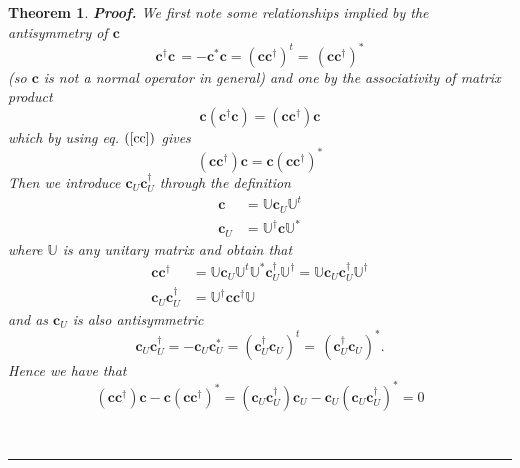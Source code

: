 \documentclass[aps,preprint]{revtex4}%
\newtheorem{theorem}{Theorem}
\newenvironment{proof}[1][Proof]{\noindent\textbf{#1.} }{\ \rule{0.5em}{0.5em}}
\begin{document}
\begin{theorem}
\begin{proof}
We first note some relationships implied by the antisymmetry of $\mathbf{c}$%
\begin{equation}
\mathbf{c}^{\dagger}\mathbf{c\,=-c}^{\ast}\mathbf{c}=\left(  \mathbf{cc}%
^{\dagger}\right)  ^{t}=\mathbf{\,}\left(  \mathbf{cc}^{\dagger}\right)
^{\ast} \label{cc}%
\end{equation}
(so $\mathbf{c}$ is not a normal operator in general) and one by the
associativity of matrix product
\begin{equation}
\mathbf{c}\left(  \mathbf{c}^{\dagger}\mathbf{c}\right)  =\left(
\mathbf{cc}^{\dagger}\right)  \mathbf{c}%
\end{equation}
which by using eq. $\left(  \ref{cc}\right)  $ gives
\begin{equation}
\left(  \mathbf{cc}^{\dagger}\right)  \mathbf{c=c}\left(  \mathbf{cc}%
^{\dagger}\right)  ^{\ast} \label{cr}%
\end{equation}
Then we introduce $\mathbf{c}_{U}\mathbf{c}_{U}^{\dagger}$ through the
definition
\begin{align}
\mathbf{c}  &  =\mathbb{U}\mathbf{c}_{U}\mathbb{U}^{t}\\
\mathbf{c}_{U}  &  =\mathbb{U}^{\dagger}\mathbf{c}\mathbb{U}^{\ast}%
\end{align}
where $\mathbb{U}$ is \emph{any} unitary matrix and obtain that
\begin{align}
\mathbf{cc}^{\dagger}  &  =\mathbb{U}\mathbf{c}_{U}\mathbb{U}^{t}%
\mathbb{U}^{\ast}\mathbf{c}_{U}^{\dagger}\mathbb{U}^{\dagger}=\mathbb{U}%
\mathbf{c}_{U}\mathbf{c}_{U}^{\dagger}\mathbb{U}^{\dagger}\nonumber\\
\mathbf{c}_{U}\mathbf{c}_{U}^{\dagger}  &  =\mathbb{U}^{\dagger}%
\mathbf{cc}^{\dagger}\mathbb{U}%
\end{align}
and as $\mathbf{c}_{U}$ is also antisymmetric
\begin{equation}
\mathbf{c}_{U}\mathbf{c}_{U}^{\dagger}=-\mathbf{c}_{U}\mathbf{c}_{U}^{\ast
}=\left(  \mathbf{c}_{U}^{\dagger}\mathbf{c}_{U}\right)  ^{t}=\mathbf{\,}%
\left(  \mathbf{c}_{U}^{\dagger}\mathbf{c}_{U}\right)  ^{\ast}.
\end{equation}
Hence we have that
\begin{equation}
\left(  \mathbf{cc}^{\dagger}\right)  \mathbf{c-c}\left(  \mathbf{cc}%
^{\dagger}\right)  ^{\ast}=\left(  \mathbf{c}_{U}\mathbf{c}_{U}^{\dagger
}\right)  \mathbf{c}_{U}-\mathbf{c}_{U}\left(  \mathbf{c}_{U}\mathbf{c}%
_{U}^{\dagger}\right)  ^{\ast}=0 \label{cu}%
\end{equation}

\end{proof}
\end{theorem}
\end{document}
